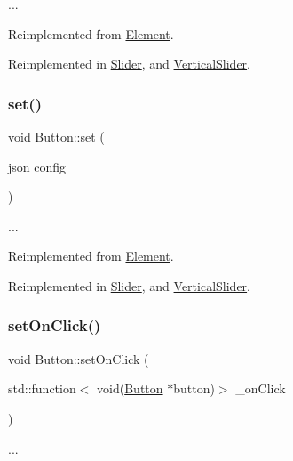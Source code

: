 ... 

Reimplemented from \hyperlink{class_element}{Element}.



Reimplemented in \hyperlink{class_slider_a0e917883961af99856847e571a461689}{Slider}, and \hyperlink{class_vertical_slider_a5e13fb542bdca4cca91f96ca15b28fad}{Vertical\+Slider}.

\mbox{\label{class_button_a6e7c3b800fae0b1e7765ccdafc88c28e}} 
\subsubsection{\texorpdfstring{set()}{set()}}
{\footnotesize\ttfamily void Button\+::set (\begin{DoxyParamCaption}\item[{json}]{config }\end{DoxyParamCaption})\hspace{0.3cm}{\ttfamily [virtual]}}

... 

Reimplemented from \hyperlink{class_element_af89dcf0a470753cf1fecd8556a802c63}{Element}.



Reimplemented in \hyperlink{class_slider_a834dbe16812e7bd4f0472882b0619ea9}{Slider}, and \hyperlink{class_vertical_slider_a35b7771bd63647aa288f16719611b567}{Vertical\+Slider}.

\mbox{\label{class_button_a0e4d6981ae08afd292ffa9a9f01939df}} 
\subsubsection{\texorpdfstring{set\+On\+Click()}{setOnClick()}}
{\footnotesize\ttfamily void Button\+::set\+On\+Click (\begin{DoxyParamCaption}\item[{std\+::function$<$ void(\hyperlink{class_button}{Button} $\ast$button)$>$}]{\+\_\+on\+Click }\end{DoxyParamCaption})}

... \mbox{\label{class_button_ad8e030c1c8846d43f3126047d4a3667f}} 
